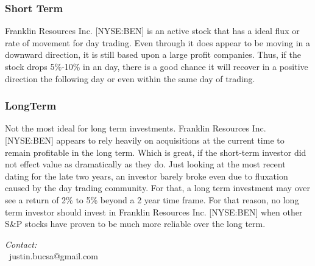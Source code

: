 \documentclass[9pt,a4paper,twoside]{tau}
\begin{document}
    \subsubsection{Short Term}
       Franklin Resources Inc. [NYSE:BEN] is an active stock that has a ideal flux or rate of movement for day trading. Even through it does appear to be moving in a downward direction, it is still based upon a large profit companies. Thus, if the stock drops 5\%-10\% in an day, there is a good chance it will recover in a positive direction the following day or even within the same day of trading.

    \subsubsection{LongTerm}
        Not the most ideal for long term investments. Franklin Resources Inc. [NYSE:BEN] appears to rely heavily on acquisitions at the current time to remain profitable in the long term. Which is great, if the short-term investor did not effect value as dramatically as they do. Just looking at the most recent dating for the late two years, an investor barely broke even due to fluxation caused by the day trading community. 
        For that, a long term investment may over see a return of 2\% to 5\% beyond a 2 year time frame. For that reason, no long term investor should invest in Franklin Resources Inc. [NYSE:BEN] when other S\&P stocks have proven to be much more reliable over the long term. 

\printbibliography



\begin{center}

	\textit{Contact:} \\

	\faEnvelope[regular]\ justin.bucsa@gmail.com \\

\end{center}

\end{document}
